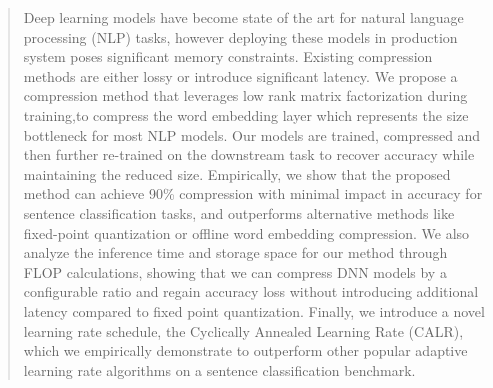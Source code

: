 \documentclass[letterpaper]{article} %
\begin{document}
\begin{abstract}
Deep learning models have become state of the art for natural language processing (NLP) tasks, however deploying these models in production system poses significant memory constraints. Existing compression methods are either lossy or introduce significant latency. We propose a compression method that leverages low rank matrix factorization during training,to compress the word embedding layer which represents the size bottleneck for most NLP models. Our models are trained, compressed and then further re-trained on the downstream task to recover accuracy while maintaining the reduced size. Empirically, we show that the proposed method can achieve 90\% compression with minimal impact in accuracy for sentence classification tasks, and outperforms alternative methods like fixed-point quantization or offline word embedding compression. We also analyze the inference time and storage space for our method through FLOP calculations, showing that we can compress DNN models by a configurable ratio and regain accuracy loss without introducing additional latency compared to fixed point quantization. Finally, we introduce a novel learning rate schedule, the Cyclically Annealed Learning Rate (CALR), which we empirically demonstrate to outperform other popular adaptive learning rate algorithms on a sentence classification benchmark.

\end{abstract}
\end{document}
